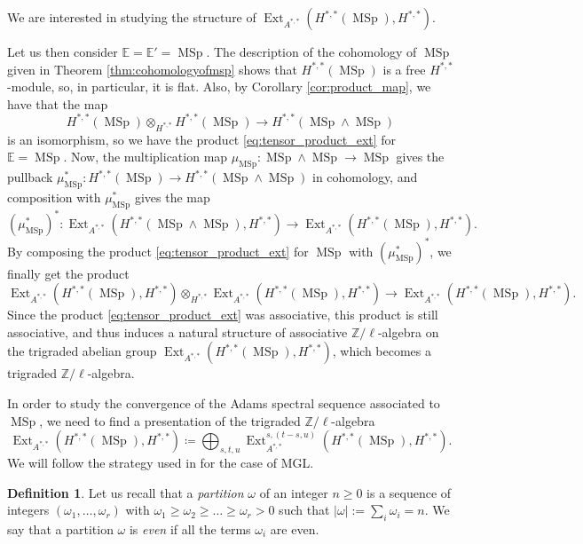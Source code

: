 \documentclass[10pt]{amsart}
\theoremstyle{definition}
\newtheorem{defn}{Definition}[section]
\theoremstyle{plain}
\numberwithin{equation}{section}
\newcommand{\0}{\emptyset}
\newcommand{\E}{{\mathbb E}}
\newcommand{\Z}{{\mathbb Z}}
\newcommand{\MSp}{{\operatorname{MSp}}}
\newcommand{\Ext}{{\operatorname{Ext}}}
\begin{document}
We are interested in studying the structure of $\Ext_{A^{*,*}}(H^{*,*}(\MSp),H^{*,*})$.

Let us then consider $\E=\E'=\MSp$. The description of the cohomology of $\MSp$ given in Theorem \ref{thm:cohomologyofmsp} shows that $H^{*,*}(\MSp)$ is a free $H^{*,*}$-module, so, in particular, it is flat. Also, by Corollary \ref{cor:product_map}, we have that the map
$$H^{*,*}(\MSp) \otimes_{H^{*,*}}H^{*,*}(\MSp) \to H^{*,*}(\MSp \wedge \MSp)$$
is an isomorphism, so we have the product \eqref{eq:tensor_product_ext} for $\E=\MSp$. Now, the multiplication map $\mu_{\MSp}:\MSp \wedge \MSp \to \MSp$ gives the pullback $\mu_{\MSp}^*:H^{*,*}(\MSp) \to H^{*,*}(\MSp \wedge \MSp)$ in cohomology, and composition with $\mu_{\MSp}^*$ gives the map
$$(\mu_{\MSp}^*)^*:\Ext_{A^{*,*}}(H^{*,*}(\MSp \wedge \MSp),H^{*,*}) \to \Ext_{A^{*,*}}(H^{*,*}(\MSp),H^{*,*}).$$
By composing the product \eqref{eq:tensor_product_ext} for $\MSp$ with $(\mu_{\MSp}^*)^*$, we finally get the product
$$\Ext_{A^{*,*}}(H^{*,*}(\MSp),H^{*,*})\otimes_{H^{*,*}}\Ext_{A^{*,*}}(H^{*,*}(\MSp),H^{*,*}) \to \Ext_{A^{*,*}}(H^{*,*}(\MSp), H^{*,*}).$$
Since the product \eqref{eq:tensor_product_ext} was associative, this product is still associative, and thus induces a natural structure of associative $\Z/\ell$-algebra on the trigraded abelian group $\Ext_{A^{*,*}}(H^{*,*}(\MSp),H^{*,*})$, which becomes a trigraded $\Z/\ell$-algebra.

In order to study the convergence of the Adams spectral sequence associated to $\MSp$, we need to find a presentation of the trigraded $\Z/\ell$-algebra
$$\Ext_{A^{*,*}}(H^{*,*}(\MSp),H^{*,*}) \coloneqq \bigoplus_{s,t,u}\Ext^{s,(t-s,u)}_{A^{*,*}}(H^{*,*}(\MSp),H^{*,*}).$$
We will follow the strategy used in \cite{lev:ellcoh} for the case of MGL.

\begin{defn}
    Let us recall that a \emph{partition} $\omega$ of an integer $n\ge0$ is a sequence of integers $(\omega_1,\ldots, \omega_r)$ with $\omega_1\ge \omega_2\ge\ldots\ge \omega_r > 0$ such that $|\omega|:=\sum_i\omega_i=n$. We say that a partition $\omega$ is \textit{even} if all the terms $\omega_i$ are even.
\end{defn}
\end{document}
